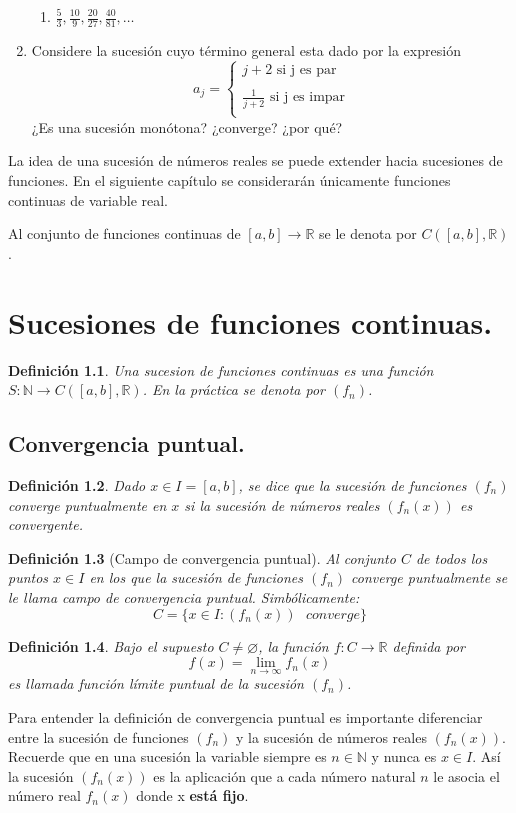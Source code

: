 \documentclass[12pt]{book}
\newcommand\R{{\mathbb R}}
\newcommand\N{{\mathbb N}}
\newtheorem{defi}{Definición}[section]
\begin{document}
\begin{enumerate}
\begin{enumerate}
        \item $\frac{5}{3},\frac{10}{9},\frac{20}{27},\frac{40}{81},\dots$
    \end{enumerate}
    \item Considere la sucesión cuyo término general esta dado por la expresión $$a_j= \left\{ \begin{array}{lcc}
             j+2 \mbox{ si j es par} \\
             \\ \frac{1}{j+2} \mbox{ si j es impar} \\
             \end{array}
             \right.$$
    ¿Es una sucesión monótona? ¿converge? ¿por qué?
\end{enumerate}
\clearpage
La idea de una sucesión de números reales se puede extender hacia sucesiones de funciones. En el siguiente capítulo se considerarán únicamente funciones continuas de variable real.

Al conjunto de funciones continuas de $[a,b] \rightarrow \R$ se le denota por $C([a,b],\R)$.
\chapter{Sucesiones de funciones continuas.}
\begin{defi}\rm
Una sucesion de funciones continuas es una función $S:\N \rightarrow C([a,b],\R)$. En la práctica se denota por $(f_n)$.
\end{defi}
\section{Convergencia puntual.}
\begin{defi}\rm
Dado $x \in I=[a,b]$, se dice que la sucesión de funciones $(f_n)$ converge puntualmente en $x$ si la sucesión de números reales $(f_n(x))$ es convergente.
\end{defi}
\begin{defi}[Campo de convergencia puntual]\rm
Al conjunto $C$ de todos los puntos $x \in I$ en los que la sucesión de funciones $(f_n)$ converge puntualmente se le llama campo de convergencia puntual. Simbólicamente: $$C=\{ x \in I : (f_n(x))\mbox{  }converge \}$$
\end{defi}
\begin{defi}\rm
Bajo el supuesto $C \neq \varnothing$, la función $f:C \rightarrow \R$ definida por $$f(x)= \lim\limits_{n\to\infty}f_n(x)$$ es llamada función límite puntual de la sucesión $(f_n)$.
\end{defi}
Para entender la definición de convergencia puntual es importante diferenciar entre la sucesión de funciones $(f_n)$ y la sucesión de números reales $(f_n(x))$. Recuerde que en una sucesión la variable siempre es $n \in \N$ y nunca es $x \in I$. Así la sucesión $(f_n(x))$ es la aplicación que a cada número natural $n$ le asocia el número real $f_n(x)$ donde x \textbf{está fijo}.
\end{document}
